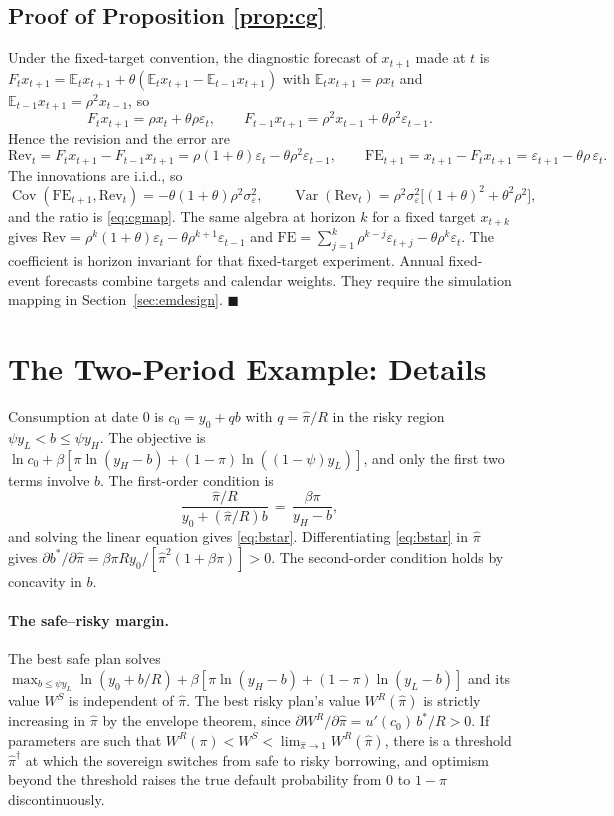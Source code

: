 \documentclass[11pt]{article}
\theoremstyle{definition}
\newcommand{\E}{\mathbb{E}}
\begin{document}
\subsection{Proof of Proposition \ref{prop:cg}}
Under the fixed-target convention, the diagnostic forecast of $x_{t+1}$ made at $t$ is $F_t x_{t+1} = \E_t x_{t+1} + \theta(\E_t x_{t+1} - \E_{t-1} x_{t+1})$ with $\E_t x_{t+1} = \rho x_t$ and $\E_{t-1} x_{t+1} = \rho^2 x_{t-1}$, so
\[
F_t x_{t+1} = \rho x_t + \theta \rho \varepsilon_t, \qquad
F_{t-1} x_{t+1} = \rho^2 x_{t-1} + \theta \rho^2 \varepsilon_{t-1}.
\]
Hence the revision and the error are
\[
\mathrm{Rev}_t = F_t x_{t+1} - F_{t-1} x_{t+1} = \rho(1+\theta)\varepsilon_t - \theta\rho^2 \varepsilon_{t-1},
\qquad
\mathrm{FE}_{t+1} = x_{t+1} - F_t x_{t+1} = \varepsilon_{t+1} - \theta\rho\,\varepsilon_t .
\]
The innovations are i.i.d., so
\[
\operatorname{Cov}(\mathrm{FE}_{t+1}, \mathrm{Rev}_t) = -\theta(1+\theta)\rho^2 \sigma_\varepsilon^2,
\qquad
\operatorname{Var}(\mathrm{Rev}_t) = \rho^2 \sigma_\varepsilon^2\big[(1+\theta)^2 + \theta^2\rho^2\big],
\]
and the ratio is \eqref{eq:cgmap}. The same algebra at horizon $k$ for a fixed target $x_{t+k}$ gives $\mathrm{Rev}=\rho^k(1+\theta)\varepsilon_t-\theta\rho^{k+1}\varepsilon_{t-1}$ and $\mathrm{FE}=\sum_{j=1}^{k}\rho^{k-j}\varepsilon_{t+j}-\theta\rho^k\varepsilon_t$. The coefficient is horizon invariant for that fixed-target experiment. Annual fixed-event forecasts combine targets and calendar weights. They require the simulation mapping in Section~\ref{sec:emdesign}. $\blacksquare$

\section{The Two-Period Example: Details}\label{app:example}

Consumption at date 0 is $c_0 = y_0 + qb$ with $q = \hat\pi / R$ in the risky region $\psi y_L < b \leq \psi y_H$. The objective is $\ln c_0 + \beta[\pi \ln(y_H - b) + (1-\pi) \ln((1-\psi) y_L)]$, and only the first two terms involve $b$. The first-order condition is
\[
\frac{\hat\pi / R}{y_0 + (\hat\pi/R) b} \,=\, \frac{\beta \pi}{y_H - b},
\]
and solving the linear equation gives \eqref{eq:bstar}. Differentiating \eqref{eq:bstar} in $\hat\pi$ gives $\partial b^*/\partial \hat\pi = \beta \pi R y_0 / [\hat\pi^2 (1+\beta\pi)] > 0$. The second-order condition holds by concavity in $b$.

\paragraph{The safe--risky margin.} The best safe plan solves $\max_{b \leq \psi y_L} \ln(y_0 + b/R) + \beta[\pi \ln(y_H - b) + (1-\pi)\ln(y_L - b)]$ and its value $W^{S}$ is independent of $\hat\pi$. The best risky plan's value $W^{R}(\hat\pi)$ is strictly increasing in $\hat\pi$ by the envelope theorem, since $\partial W^R/\partial \hat\pi = u'(c_0)\, b^*/R > 0$. If parameters are such that $W^R(\pi) < W^S < \lim_{\hat\pi \to 1} W^R(\hat\pi)$, there is a threshold $\hat\pi^\dagger$ at which the sovereign switches from safe to risky borrowing, and optimism beyond the threshold raises the true default probability from $0$ to $1 - \pi$ discontinuously.
\end{document}
